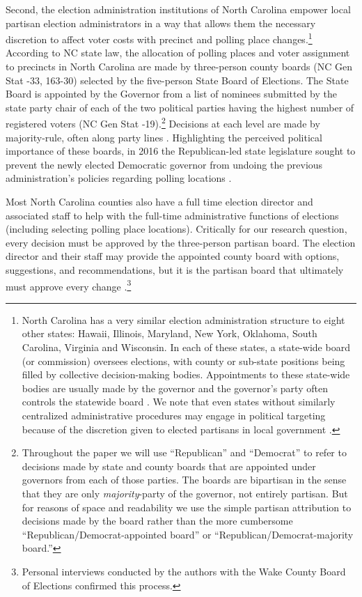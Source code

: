 \documentclass[12pt]{article}
\begin{document}
Second, the election administration institutions of North Carolina empower local partisan election administrators in a way that allows them the necessary discretion to affect voter costs with precinct and polling place changes.\footnote{North Carolina has a very similar election administration structure to eight other states: Hawaii, Illinois, Maryland, New York, Oklahoma, South Carolina, Virginia and Wisconsin. In each of these states, a state-wide board (or commission) oversees elections, with county or sub-state positions being filled by collective decision-making bodies. Appointments to these state-wide bodies are usually made by the governor and the governor's party often controls the statewide board \citep{ncsl2016}. We note that even states without similarly centralized administrative procedures may engage in political targeting because of the discretion given to elected partisans in local government \citep{kimball2006helping, amos2017reprecincting}.}  According to NC state law, the allocation of polling places and voter assignment to precincts in North Carolina are made by three-person county boards (NC Gen Stat -33, 163-30) selected by the five-person State Board of Elections. The State Board is appointed by the Governor from a list of nominees submitted by the state party chair of each of the two political parties having the highest number of registered voters (NC Gen Stat -19).\footnote{Throughout the paper we will use ``Republican'' and ``Democrat'' to refer to decisions made by state and county boards that are appointed under governors from each of those parties.  The boards are bipartisan in the sense that they are only \emph{majority}-party of the governor, not entirely partisan.  But for reasons of space and readability we use the simple partisan attribution to decisions made by the board rather than the more cumbersome ``Republican/Democrat-appointed board'' or ``Republican/Democrat-majority board.''  } Decisions at each level are made by majority-rule, often along party lines \citep{Phipps:2014ur}.  Highlighting the perceived political importance of these boards, in 2016 the Republican-led state legislature sought to prevent the newly elected Democratic governor from undoing the previous administration's policies regarding polling locations \citep{Seward:2018tc, stern2018, michaelson2016}.

Most North Carolina counties also have a full time election director and associated staff to help with the full-time administrative functions of elections (including selecting polling place locations).  Critically for our research question, every decision must be approved by the three-person partisan board. The election director and their staff may provide the appointed county board with options, suggestions, and recommendations, but it is the partisan board that ultimately must approve every change \citep{stern2018, michaelson2016, ap2018}.\footnote{Personal interviews conducted by the authors with the Wake County Board of Elections confirmed this process.}
\end{document}
